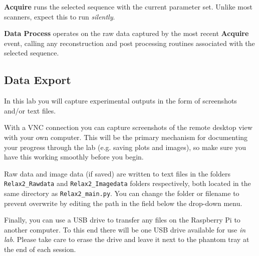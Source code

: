 \textbf{Acquire} runs the selected sequence with the current parameter set. Unlike most scanners, expect this to run \emph{silently}.

\textbf{Data Process} operates on the raw data captured by the most recent \textbf{Acquire} event, calling any reconstruction and post processing routines associated with the selected sequence.

\subsection{Data Export}
\noindent{}In this lab you will capture experimental outputs in the form of screenshots and/or text files.

With a VNC connection you can capture screenshots of the remote desktop view with your own computer. This will be the primary mechanism for documenting your progress through the lab (e.g. saving plots and images), so make sure you have this working smoothly before you begin.


Raw data and image data (if saved) are written to text files in the folders \texttt{Relax2\_Rawdata} and \texttt{Relax2\_Imagedata} folders respectively, both located in the same directory as \texttt{Relax2\_main.py}. You can change the folder or filename to prevent overwrite by editing the path in the field below the drop-down menu.

Finally, you can use a USB drive to transfer any files on the Raspberry Pi to another computer. To this end there will be one USB drive available for use \emph{in lab}. Please take care to erase the drive and leave it next to the phantom tray at the end of each session.

